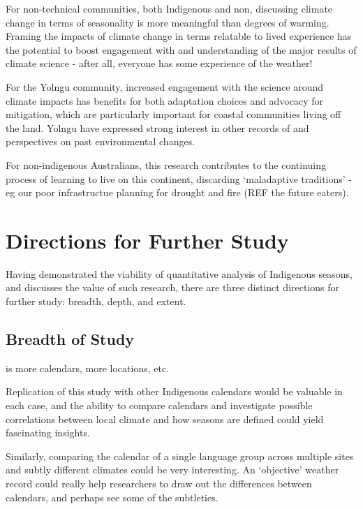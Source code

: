 For non-technical communities, both Indigenous and non, discussing climate
change in terms of seasonality is more meaningful than degrees of warming.
Framing the impacts of climate change in terms relatable to lived experience
has the potential to boost engagement with and understanding of the major
results of climate science - after all, everyone has some experience of the
weather!

For the Yolngu community, increased engagement with the science around climate
impacts has benefits for both adaptation choices and advocacy for mitigation,
which are particularly important for coastal communities living off the land.
Yolngu have expressed strong interest in other records of and perspectives on
past environmental changes.

For non-indigenous Australians, this research contributes to the continuing
process of learning to live on this continent, discarding `maladaptive traditions'
- eg our poor infrastructue planning for drought and fire (REF the future eaters).



\section{Directions for Further Study}
\label{sec:further-study}

Having demonstrated the viability of quantitative analysis of Indigenous
seasons, and discusses the value of such research, there are three distinct
directions for further study:  breadth, depth, and extent.


\subsection{Breadth of Study}
is more calendars, more locations, etc.

Replication of this study with other Indigenous calendars would be
valuable in each case, and the ability to compare calendars and investigate
possible correlations between local climate and how seasons are
defined could yield fascinating insights.

Similarly, comparing the calendar of a single language group across
multiple sites and subtly different climates could be very interesting.
An `objective' weather record could really help researchers to draw out
the differences between calendars, and perhaps see some of the subtleties.



